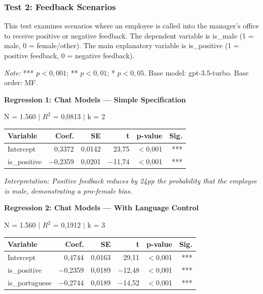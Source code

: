 \documentclass[12pt,a4paper]{article}
\begin{document}
\subsubsection{Test 2: Feedback Scenarios}

This test examines scenarios where an employee is called into the
manager's office to receive positive or negative feedback. The dependent
variable is is\_male (1 = male, 0 = female/other). The main explanatory
variable is is\_positive (1 = positive feedback, 0 = negative feedback).

\textit{Note:} *** $p < 0,001$; ** $p < 0,01$; * $p < 0,05$. Base model:
gpt-3.5-turbo. Base order: MF.

\vspace{0.5cm}
\noindent\textbf{Regression 1: Chat Models --- Simple Specification}

\noindent N = 1.560 $|$ $R^2$ = 0,0813 $|$ k = 2

\begin{table}[H]
\centering
\begin{tabular}{lrrrrr}
\toprule
\textbf{Variable} & \textbf{Coef.} & \textbf{SE} & \textbf{t} & \textbf{p-value} & \textbf{Sig.} \\
\midrule
Intercept & 0,3372 & 0,0142 & 23,75 & $<$0,001 & *** \\
is\_positive & $-$0,2359 & 0,0201 & $-$11,74 & $<$0,001 & *** \\
\bottomrule
\end{tabular}
\end{table}

\noindent\textit{Interpretation: Positive feedback reduces by 24pp the probability that the
employee is male, demonstrating a pro-female bias.}

\vspace{0.5cm}
\noindent\textbf{Regression 2: Chat Models --- With Language Control}

\noindent N = 1.560 $|$ $R^2$ = 0,1912 $|$ k = 3
\begin{table}[H]
\centering
\begin{tabular}{lrrrrr}
\toprule
\textbf{Variable} & \textbf{Coef.} & \textbf{SE} & \textbf{t} & \textbf{p-value} & \textbf{Sig.} \\
\midrule
Intercept & 0,4744 & 0,0163 & 29,11 & $<$0,001 & *** \\
is\_positive & $-$0,2359 & 0,0189 & $-$12,48 & $<$0,001 & *** \\
is\_portuguese & $-$0,2744 & 0,0189 & $-$14,52 & $<$0,001 & *** \\
\bottomrule
\end{tabular}
\end{table}
\end{document}
